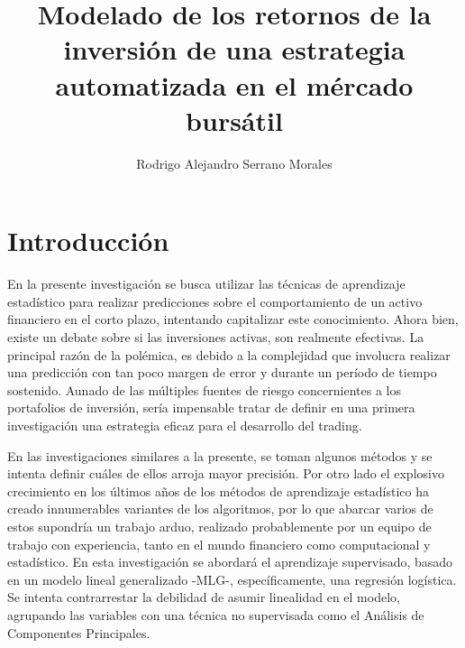 \documentclass[a4paper,12pt]{Latex/Classes/PhDthesisPSnPDF}
\title{Modelado de los retornos de la inversión de una estrategia automatizada en el mércado bursátil}
\author{Rodrigo Alejandro Serrano Morales}
\begin{document}


\maketitle									%

\newpage\renewcommand{\thepage}{\arabic{page}}\setcounter{page}{1} 


\tableofcontents
\listoffigures
\listoftables



\chapter*{Introducción}

En la presente investigación se busca utilizar las técnicas de aprendizaje estadístico para realizar predicciones sobre el comportamiento de un activo financiero en el corto  plazo, intentando capitalizar este conocimiento. Ahora bien, existe un debate sobre si las inversiones activas, son realmente efectivas. La principal razón de la polémica, es debido a la complejidad que involucra realizar una predicción con tan poco margen de error y durante un período de tiempo sostenido. Aunado de las múltiples fuentes de riesgo concernientes a los portafolios de inversión, sería impensable tratar de definir en una primera investigación una estrategia eficaz para el desarrollo del trading.

En las investigaciones similares a la presente, se toman algunos métodos y se intenta definir cuáles de ellos arroja mayor precisión. Por otro lado el explosivo crecimiento en los últimos años de los métodos de aprendizaje estadístico ha creado innumerables variantes de los algoritmos, por lo que abarcar varios de estos supondría un trabajo arduo, realizado probablemente por un equipo de trabajo con experiencia, tanto en el mundo financiero como computacional y estadístico.  En esta investigación se abordará el aprendizaje supervisado, basado en un modelo lineal generalizado -MLG-, específicamente, una regresión logística. Se intenta contrarrestar la debilidad de asumir linealidad en el modelo, agrupando las variables con una técnica no supervisada como el Análisis de Componentes Principales.
\end{document}
